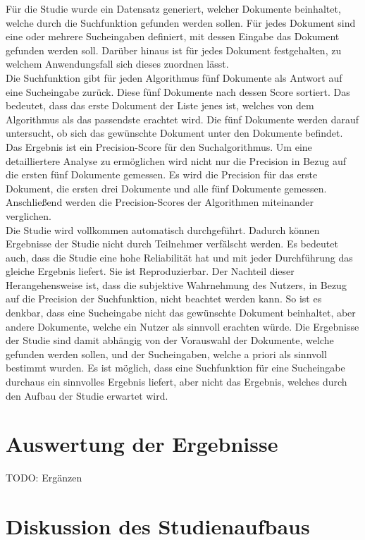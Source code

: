 Für die Studie wurde ein Datensatz generiert, welcher Dokumente beinhaltet, welche durch die Suchfunktion gefunden werden sollen.
Für jedes Dokument sind eine oder mehrere Sucheingaben definiert, mit dessen Eingabe das Dokument gefunden werden soll.
Darüber hinaus ist für jedes Dokument festgehalten, zu welchem Anwendungsfall sich dieses zuordnen lässt.\\

Die Suchfunktion gibt für jeden Algorithmus fünf Dokumente als Antwort auf eine Sucheingabe zurück.
Diese fünf Dokumente nach dessen Score sortiert.
Das bedeutet, dass das erste Dokument der Liste jenes ist, welches von dem Algorithmus als das passendste erachtet wird.
Die fünf Dokumente werden darauf untersucht, ob sich das gewünschte Dokument unter den Dokumente befindet.
Das Ergebnis ist ein Precision-Score für den Suchalgorithmus.
Um eine detailliertere Analyse zu ermöglichen wird nicht nur die Precision in Bezug auf die ersten fünf Dokumente gemessen.
Es wird die Precision für das erste Dokument, die ersten drei Dokumente und alle fünf Dokumente gemessen.
Anschließend werden die Precision-Scores der Algorithmen miteinander verglichen.\\

Die Studie wird vollkommen automatisch durchgeführt.
Dadurch können Ergebnisse der Studie nicht durch Teilnehmer verfälscht werden.
Es bedeutet auch, dass die Studie eine hohe Reliabilität hat und mit jeder Durchführung das gleiche Ergebnis liefert.
Sie ist Reproduzierbar.
Der Nachteil dieser Herangehensweise ist, dass die subjektive Wahrnehmung des Nutzers, in Bezug auf die Precision der Suchfunktion, nicht beachtet werden kann.
So ist es denkbar, dass eine Sucheingabe nicht das gewünschte Dokument beinhaltet, aber andere Dokumente, welche ein Nutzer als sinnvoll erachten würde.
Die Ergebnisse der Studie sind damit abhängig von der Vorauswahl der Dokumente, welche gefunden werden sollen, und der Sucheingaben, welche a priori als sinnvoll bestimmt wurden.
Es ist möglich, dass eine Suchfunktion für eine Sucheingabe durchaus ein sinnvolles Ergebnis liefert, aber nicht das Ergebnis, welches durch den Aufbau der Studie erwartet wird.

\section{Auswertung der Ergebnisse}
TODO: Ergänzen

\section{Diskussion des Studienaufbaus}

